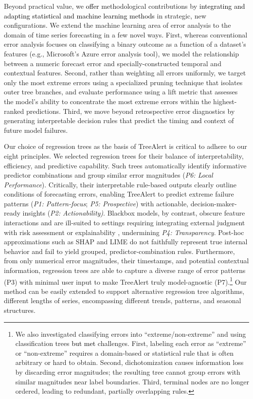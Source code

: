 \documentclass[]{interact}
\newcommand{\galit}[1]{\textcolor{black}{#1}}
\theoremstyle{plain}
\theoremstyle{definition}
\theoremstyle{remark}
\begin{document}
Beyond practical value, we \galit{offer} methodological contributions by \galit{integrating and adapting statistical and machine learning methods}
in strategic, new configurations. We extend the machine learning area of error analysis to the domain of time series forecasting in a few novel ways. First, whereas conventional error analysis focuses on classifying a binary outcome as a function of a dataset's features (e.g., Microsoft's Azure error analysis tool),
we model the relationship between a numeric forecast error and specially-constructed
temporal and contextual features. Second, rather than weighting all errors uniformly, we target only the most extreme errors using a specialized pruning technique that isolates outer tree branches, and evaluate performance using a lift metric that assesses the model's ability to concentrate the most extreme errors within the highest-ranked predictions. Third, we move beyond retrospective error diagnostics by generating interpretable decision rules that predict the timing \galit{and} context of future model failures.

Our choice of regression trees as the basis of TreeAlert is critical to adhere to our eight principles. We selected regression trees for their balance of interpretability, efficiency, and predictive capability. Such trees automatically identify informative predictor combinations and group similar error magnitudes (\emph{P6: Local Performance}). Critically, their interpretable rule-based outputs clearly outline conditions of forecasting errors, enabling TreeAlert to predict extreme failure patterns (\emph{P1: Pattern-focus}; \emph{P5: Prospective}) with actionable, decision-maker-ready insights (\emph{P2: Actionability)}. Blackbox models, by contrast, obscure feature interactions and are ill-suited to settings requiring integrating external judgment with risk assessment or explainability \citep{rudin2019, houssainy2021}, undermining \emph{P4: Transparency}. Post-hoc approximations such as SHAP and LIME do not faithfully represent true internal behavior \citep{rudin2019} and fail to yield grouped, predictor-combination rules. Furthermore, from only numerical error magnitudes, their timestamps, and potential contextual information, regression trees are able to capture a diverse range of error patterns (P3) with minimal user input to make TreeAlert truly model-agnostic (P7).\footnote{We also investigated classifying errors into ``extreme/non-extreme'' and using classification trees \galit{but met} challenges. First, labeling each error as ``extreme'' or ``non-extreme'' requires a domain-based or statistical rule that is often arbitrary or hard to obtain. Second, dichotomization causes information loss by discarding error magnitudes; the resulting tree cannot group errors with similar magnitudes near label boundaries. Third, terminal nodes are no longer ordered, leading to redundant, partially overlapping rules.}
Our method can be easily extended to support alternative regression tree algorithms, different lengths of series, encompassing different trends, patterns, and seasonal structures.
\end{document}
